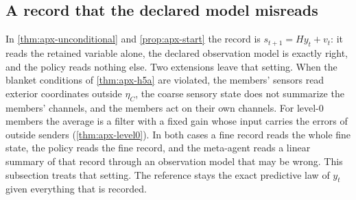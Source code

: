 \subsection{A record that the declared model misreads}\label{sec:apx-obs}

In \cref{thm:apx-unconditional} and \cref{prop:apx-start} the record is $s_{t+1}=Hy_t+v_t$: it reads the retained variable alone, the declared observation model is exactly right, and the policy reads nothing else. Two extensions leave that setting. When the blanket conditions of \cref{thm:apx-h5a} are violated, the members' sensors read exterior coordinates outside $\eta_C$, the coarse sensory state does not summarize the members' channels, and the members act on their own channels. For level-0 members the average is a filter with a fixed gain whose input carries the errors of outside senders (\cref{thm:apx-level0}). In both cases a fine record reads the whole fine state, the policy reads the fine record, and the meta-agent reads a linear summary of that record through an observation model that may be wrong. This subsection treats that setting. The reference stays the exact predictive law of $y_t$ given everything that is recorded.

